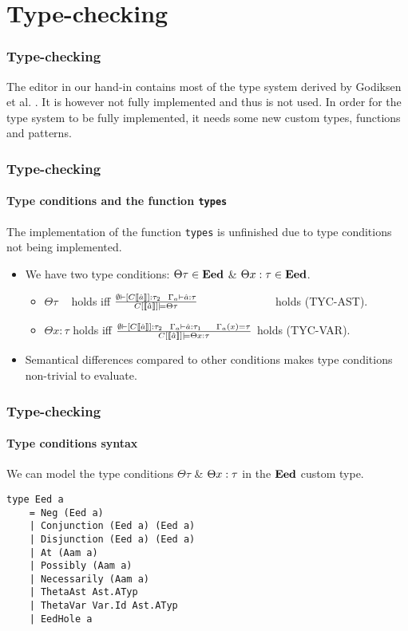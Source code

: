 \section{Type-checking}

\begin{frame}
    \frametitle{Type-checking}
    The editor in our hand-in contains most of the type system derived by
    Godiksen et al. \pepm. It is however not fully implemented and thus is not
    used. In order for the type system to be fully implemented, it needs some
    new custom types, functions and patterns.
\end{frame}

\begin{frame}
    \frametitle{Type-checking}
    \framesubtitle{Type conditions and the function \texttt{types}}
    The implementation of the function \texttt{types} is unfinished due to type
    conditions not being implemented.
    \pause
    \begin{itemize}
      \item We have two type conditions: $\Theta \tau\in \textbf{Eed}$ \& $\Theta x : \tau \in \textbf{Eed}$.
        \begin{itemize}
          \item $\Theta \tau~~~~$ holds iff $\frac{\emptyset \vdash [C\llbracket \hat{a} \rrbracket] : \tau_2~~\Gamma_{a}\vdash \hat{a} : \tau }{C[\llbracket \hat{a} \rrbracket] \models \Theta \tau}$ ~~~~~~~~~~~~~holds (TYC-AST).
        \item $\Theta x : \tau$ holds iff $\frac{\emptyset \vdash [C\llbracket \hat{a} \rrbracket] : \tau_2~~\Gamma_{a}\vdash \hat{a} : \tau_1 ~~~~ \Gamma_{a}(x) = \tau }{C[\llbracket \hat{a} \rrbracket] \models \Theta x : \tau}$ holds (TYC-VAR).
        \end{itemize}
          \pause
        \item Semantical differences compared to other conditions makes type
          conditions non-trivial to evaluate.
    \end{itemize}
\end{frame}

\begin{frame}[fragile]
    \frametitle{Type-checking}
    \framesubtitle{Type conditions syntax}
    We can model the type conditions $\Theta \tau$ \& $\Theta x : \tau$
    in the $\textbf{Eed}$ custom type.
    \begin{lstlisting}
type Eed a
    = Neg (Eed a)
    | Conjunction (Eed a) (Eed a)
    | Disjunction (Eed a) (Eed a)
    | At (Aam a)
    | Possibly (Aam a)
    | Necessarily (Aam a)
    | ThetaAst Ast.ATyp
    | ThetaVar Var.Id Ast.ATyp
    | EedHole a
    \end{lstlisting}
\end{frame}

